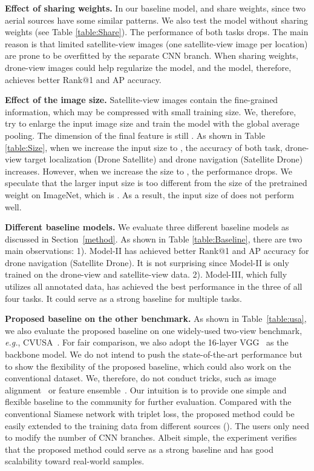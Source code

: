 \documentclass[sigconf]{acmart}
\def\eg{\emph{e.g.}}
\begin{document}
\noindent\textbf{Effect of sharing weights.} In our baseline model,  and  share weights, since two aerial sources have some similar patterns. We also test the model without sharing weights (see Table \ref{table:Share}). The performance of both tasks drops. The main reason is that limited satellite-view images (one satellite-view image per location) are prone to be overfitted by the separate CNN branch. When sharing weights, drone-view images could help regularize the model, and the model, therefore, achieves better Rank@1 and AP accuracy.

\noindent\textbf{Effect of the image size.} Satellite-view images contain the fine-grained information, which may be compressed with small training size. We, therefore, try to enlarge the input image size and train the model with the global average pooling. The dimension of the final feature is still . As shown in Table \ref{table:Size}, when we increase the input size to , the accuracy of both task, drone-view target localization (Drone  Satellite) and drone navigation (Satellite  Drone) increases. However, when we increase the size to , the performance drops. We speculate that the larger input size is too different from the size of the pretrained weight on ImageNet, which is . As a result, the input size of  does not perform well. 

\noindent\textbf{Different baseline models.} 
We evaluate three different baseline models as discussed in Section~\ref{method}. As shown in Table \ref{table:Baseline}, there are two main observations: 
1). Model-II has achieved better Rank@1 and AP accuracy for drone navigation (Satellite  Drone). It is not surprising since Model-II is only trained on the drone-view and satellite-view data. 2). Model-III, which fully utilizes all annotated data, has achieved the best performance in the three of all four tasks. It could serve as a strong baseline for multiple tasks. 

\noindent\textbf{Proposed baseline on the other benchmark.} 
As shown in Table~\ref{table:usa}, we also evaluate the proposed baseline on one widely-used two-view benchmark, \eg, CVUSA~\cite{zhai2017predicting}. For fair comparison, we also adopt the 16-layer VGG~\cite{simonyan2014very} as the backbone model. We do not intend to push the state-of-the-art performance but to show the flexibility of the proposed baseline, which could also work on the conventional dataset. We, therefore, do not conduct tricks, such as image alignment~\cite{shi2019spatial} or feature ensemble~\cite{regmi2019bridging}.
Our intuition is to provide one simple and flexible baseline to the community for further evaluation. Compared with the conventional Siamese network with triplet loss, the proposed method could be easily extended to the training data from  different sources (). 
The users only need to modify the number of CNN branches. Albeit simple, the experiment verifies that the proposed method could serve as a strong baseline and has good scalability toward real-world samples.
\end{document}
